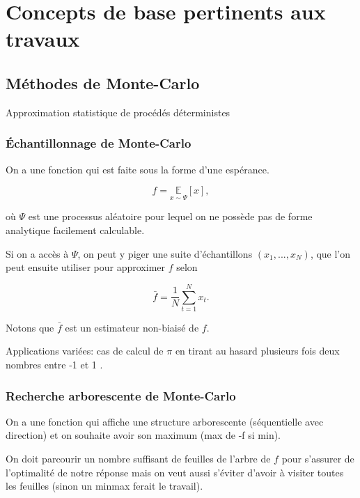 \chapter{Concepts de base pertinents aux travaux}     %
\label{chap:prerequis}                   %

\section{Méthodes de Monte-Carlo}

Approximation statistique de procédés déterministes

\subsection{Échantillonnage de Monte-Carlo}
\label{souschap:mcs}

On a une fonction qui est faite sous la forme d'une espérance.

\begin{equation*}
    f = \underset{x \sim \Psi}{\mathbb{E}} \left[x\right],
\end{equation*}

où $\Psi$ est une processus aléatoire pour lequel on ne possède pas de forme analytique
facilement calculable.

Si on a accès à $\Psi$, on peut y piger une suite d'échantillons $(x_1, ..., x_N)$,
que l'on peut ensuite utiliser pour approximer $f$ selon

\begin{equation*}
    \bar{f} = \frac{1}{N} \sum_{t=1}^N x_t.
\end{equation*}

Notons que $\bar{f}$ est un estimateur non-biaisé de $f$.

Applications variées: cas de calcul de $\pi$ en tirant au hasard plusieurs
fois deux nombres entre -1 et 1 \citep{doi:10.1080/00029890.1969.12000364}.

\subsection{Recherche arborescente de Monte-Carlo}

On a une fonction qui affiche une structure arborescente
(séquentielle avec direction) et on souhaite avoir son maximum (max de -f si min).

On doit parcourir un nombre suffisant de feuilles de l'arbre de $f$ pour
s'assurer de l'optimalité de notre réponse mais on veut aussi s'éviter d'avoir
à visiter toutes les feuilles (sinon un minmax ferait le travail).

